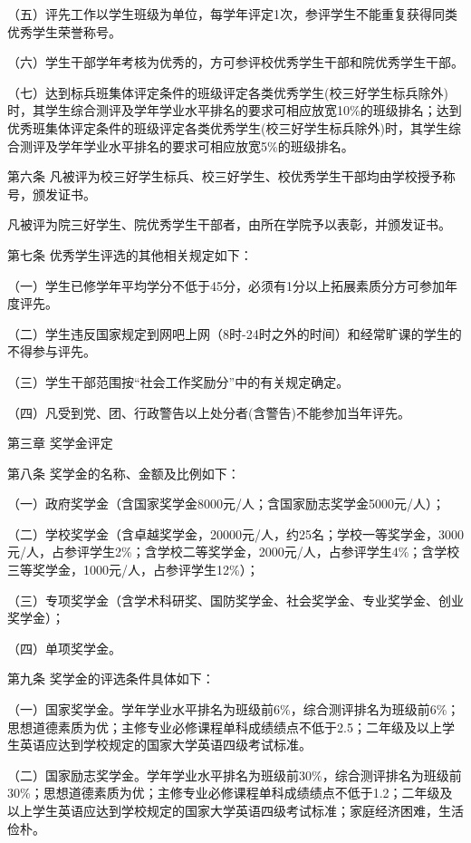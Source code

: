\documentclass[UTF8,12pt,a4paper]{report}
\begin{document}
（五）评先工作以学生班级为单位，每学年评定1次，参评学生不能重复获得同类优秀学生荣誉称号。

（六）学生干部学年考核为优秀的，方可参评校优秀学生干部和院优秀学生干部。

（七）达到标兵班集体评定条件的班级评定各类优秀学生(校三好学生标兵除外)时，其学生综合测评及学年学业水平排名的要求可相应放宽10\%的班级排名；达到优秀班集体评定条件的班级评定各类优秀学生(校三好学生标兵除外)时，其学生综合测评及学年学业水平排名的要求可相应放宽5\%的班级排名。

第六条  凡被评为校三好学生标兵、校三好学生、校优秀学生干部均由学校授予称号，颁发证书。

凡被评为院三好学生、院优秀学生干部者，由所在学院予以表彰，并颁发证书。

第七条  优秀学生评选的其他相关规定如下：

（一）学生已修学年平均学分不低于45分，必须有1分以上拓展素质分方可参加年度评先。

（二）学生违反国家规定到网吧上网（8时-24时之外的时间）和经常旷课的学生的不得参与评先。

（三）学生干部范围按“社会工作奖励分”中的有关规定确定。

（四）凡受到党、团、行政警告以上处分者(含警告)不能参加当年评先。



第三章  奖学金评定

第八条  奖学金的名称、金额及比例如下：

（一）政府奖学金（含国家奖学金8000元/人；含国家励志奖学金5000元/人）；

（二）学校奖学金（含卓越奖学金，20000元/人，约25名；学校一等奖学金，3000元/人，占参评学生2\%；含学校二等奖学金，2000元/人，占参评学生4\%；含学校三等奖学金，1000元/人，占参评学生12\%）；

（三）专项奖学金（含学术科研奖、国防奖学金、社会奖学金、专业奖学金、创业奖学金）；

（四）单项奖学金。

第九条  奖学金的评选条件具体如下：

（一）国家奖学金。学年学业水平排名为班级前6\%，综合测评排名为班级前6\%；思想道德素质为优；主修专业必修课程单科成绩绩点不低于2.5；二年级及以上学生英语应达到学校规定的国家大学英语四级考试标准。

（二）国家励志奖学金。学年学业水平排名为班级前30\%，综合测评排名为班级前30\%；思想道德素质为优；主修专业必修课程单科成绩绩点不低于1.2；二年级及以上学生英语应达到学校规定的国家大学英语四级考试标准；家庭经济困难，生活俭朴。
\end{document}
